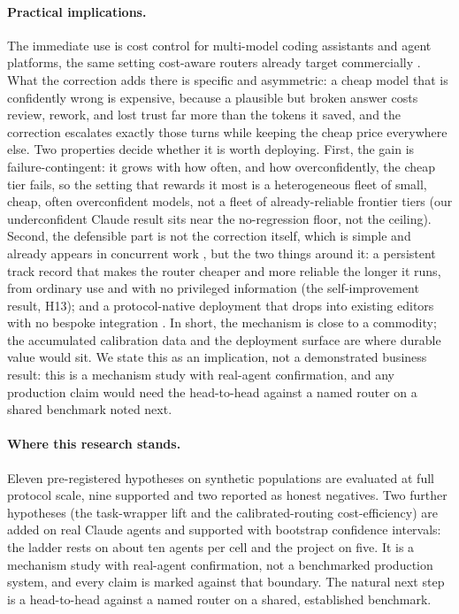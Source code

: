 \documentclass[11pt]{article}
\begin{document}
\paragraph{Practical implications.} The immediate use is cost control for multi-model coding assistants and agent platforms, the same setting cost-aware routers already target commercially \citep{chen2023frugalgpt,ong2024routellm,ding2025bestroute}. What the correction adds there is specific and asymmetric: a cheap model that is confidently wrong is expensive, because a plausible but broken answer costs review, rework, and lost trust far more than the tokens it saved, and the correction escalates exactly those turns while keeping the cheap price everywhere else. Two properties decide whether it is worth deploying. First, the gain is failure-contingent: it grows with how often, and how overconfidently, the cheap tier fails, so the setting that rewards it most is a heterogeneous fleet of small, cheap, often overconfident models, not a fleet of already-reliable frontier tiers (our underconfident Claude result sits near the no-regression floor, not the ceiling). Second, the defensible part is not the correction itself, which is simple and already appears in concurrent work \citep{armstrong2026margin,kotte2026ucci}, but the two things around it: a persistent track record that makes the router cheaper and more reliable the longer it runs, from ordinary use and with no privileged information (the self-improvement result, H13); and a protocol-native deployment that drops into existing editors with no bespoke integration \citep{acp2025}. In short, the mechanism is close to a commodity; the accumulated calibration data and the deployment surface are where durable value would sit. We state this as an implication, not a demonstrated business result: this is a mechanism study with real-agent confirmation, and any production claim would need the head-to-head against a named router on a shared benchmark noted next.

\paragraph{Where this research stands.} Eleven pre-registered hypotheses on synthetic populations are evaluated at full protocol scale, nine supported and two reported as honest negatives. Two further hypotheses (the task-wrapper lift and the calibrated-routing cost-efficiency) are added on real Claude agents and supported with bootstrap confidence intervals: the ladder rests on about ten agents per cell and the project on five. It is a mechanism study with real-agent confirmation, not a benchmarked production system, and every claim is marked against that boundary. The natural next step is a head-to-head against a named router on a shared, established benchmark.
\end{document}
